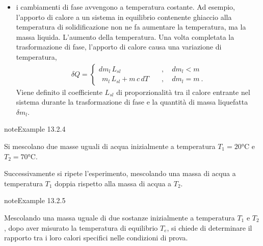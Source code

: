 \documentclass[letterpaper,10pt,italian]{jupyterBook}
\begin{document}
\begin{itemize}
\item {} 
\sphinxAtStartPar
i cambiamenti di fase avvengono a temperatura costante. Ad esempio, l’apporto di calore a un sistema in equilibrio contenente ghiaccio alla temperatura di solidificazione non ne fa aumentare la temperatura, ma la massa liquida. L’aumento della temperatura. Una volta completata la trasformazione di fase, l’apporto di calore causa una variazione di temperatura,
\begin{equation*}
\begin{split}\delta Q = \begin{cases}
      d m_{l} \, L_{sl}                 \quad & , \quad {d m_l < m} \\
    \ \ m_{l} \, L_{sl} + m \, c \, d T \quad & , \quad {d m_l = m} \ .
    \end{cases}\end{split}
\end{equation*}
\sphinxAtStartPar
Viene definito  il coefficiente \(L_{sl}\) di proporzionalità tra il calore entrante nel sistema durante la trasformazione di fase e la quantità di massa liquefatta \(\delta m_l\).

\end{itemize}
\label{ch/thermodynamics/foundation-experiments:thermodynamics:history:heat-capacity:1}
\begin{sphinxadmonition}{note}{Example 13.2.4}



\sphinxAtStartPar
Si mescolano due masse uguali di acqua inizialmente a temperatura \(T_1 = 20 \text{°C}\) e \(T_2 = 70 \text{°C}\).

\sphinxAtStartPar
Successivamente si ripete l’esperimento, mescolando una massa di acqua a temperatura \(T_1\) doppia rispetto alla massa di acqua a \(T_2\).
\end{sphinxadmonition}
\label{ch/thermodynamics/foundation-experiments:thermodynamics:history:heat-capacity:2}
\begin{sphinxadmonition}{note}{Example 13.2.5}



\sphinxAtStartPar
Mescolando una massa uguale di due sostanze inizialmente a temperatura \(T_1\)  e \(T_2\), dopo aver misurato la temperatura di equilibrio \(T_e\), si chiede di determinare il rapporto tra i loro calori specifici nelle condizioni di prova.
\end{sphinxadmonition}
\label{ch/thermodynamics/foundation-experiments:thermodynamics:history:heat-capacity:3}
\end{document}
